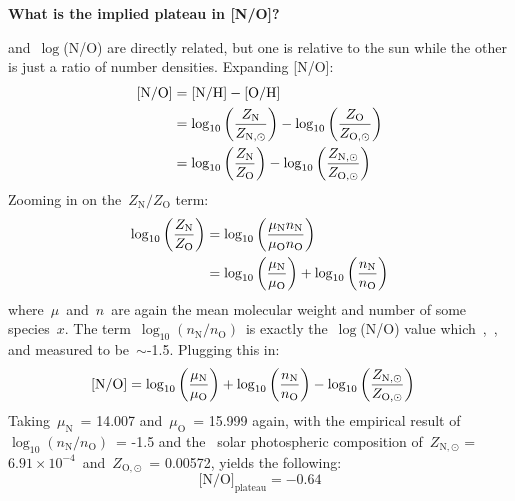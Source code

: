 \documentclass[\main/notes.tex]{subfiles}
\begin{document}
\newpage\noindent 
\textbf{What is the implied plateau in [N/O]?} 
\par\noindent 
[N/O] and~$\log$(N/O) are directly related, but one is relative to the sun 
while the other is just a ratio of number densities. Expanding [N/O]: 
\begin{subequations}\begin{align} 
\text{[N/O]} &= \text{[N/H]} - \text{[O/H]} \\ 
&= \log_{10}\left(\frac{\displaystyle Z_\text{N}}{\displaystyle Z_{\text{N},\odot}}\right) - 
\log_{10}\left(\frac{\displaystyle Z_\text{O}}{\displaystyle Z_{\text{O},\odot}}\right) 
\\ 
&= \log_{10}\left(\frac{\displaystyle Z_\text{N}}{\displaystyle Z_\text{O}}\right) - \log_{10}\left(
\frac{\displaystyle Z_{\text{N},\odot}}{\displaystyle Z_{\text{O},\odot}}\right) 
\end{align}\end{subequations} 
Zooming in on the~$Z_\text{N}/Z_\text{O}$ term: 
\begin{subequations}\begin{align} 
\log_{10}\left(\frac{\displaystyle Z_\text{N}}{\displaystyle Z_\text{O}}\right) &= 
\log_{10}\left(\frac{\displaystyle \mu_\text{N}n_\text{N}}{\displaystyle \mu_\text{O}n_\text{O}}\right) \\ 
&= \log_{10}\left(\frac{\displaystyle \mu_\text{N}}{\displaystyle \mu_\text{O}}\right) + \log_{10}\left(
\frac{\displaystyle n_\text{N}}{\displaystyle n_\text{O}}\right) 
\end{align}\end{subequations} 
where~$\mu$~and~$n$~are again the mean molecular weight and number of some 
species~$x$. The term~$\log_{10}\left(n_\text{N}/n_\text{O}\right)$~is exactly 
the~$\log$(N/O) value which~\citet{Berg2012},~\citet*{Izotov2012}, and 
\citet{James2015} measured to be~$\sim$-1.5. Plugging this in: 
\begin{subequations}\begin{align} 
\text{[N/O]} &= \log_{10}\left(\frac{\displaystyle \mu_\text{N}}{\displaystyle \mu_\text{O}}\right) + 
\log_{10}\left(\frac{\displaystyle n_\text{N}}{\displaystyle n_\text{O}}\right) - \log_{10}\left(
\frac{\displaystyle Z_{\text{N},\odot}}{\displaystyle Z_{\text{O},\odot}}\right) 
\end{align}\end{subequations} 
Taking~$\mu_\text{N}$~= 14.007 and~$\mu_\text{O}$~= 15.999 again, with the 
empirical result of~$\log_{10}\left(n_\text{N}/n_\text{O}\right)$~= -1.5 and 
the~\citet{Asplund2009} solar photospheric composition of~$Z_{\text{N},\odot}$ 
= $6.91\times10^{-4}$~and~$Z_{\text{O},\odot}$~= 0.00572, yields the following: 
\begin{equation} 
\text{[N/O]}_\text{plateau} = -0.64 
\end{equation} 
\end{document}
